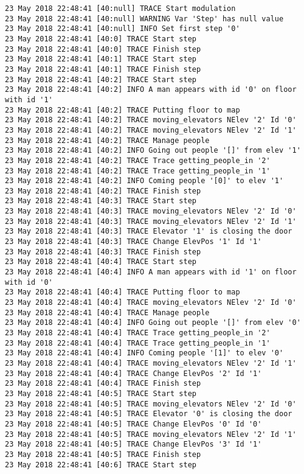 \begin{lstlisting}
23 May 2018 22:48:41 [40:null] TRACE Start modulation
23 May 2018 22:48:41 [40:null] WARNING Var 'Step' has null value
23 May 2018 22:48:41 [40:null] INFO Set first step '0'
23 May 2018 22:48:41 [40:0] TRACE Start step
23 May 2018 22:48:41 [40:0] TRACE Finish step
23 May 2018 22:48:41 [40:1] TRACE Start step
23 May 2018 22:48:41 [40:1] TRACE Finish step
23 May 2018 22:48:41 [40:2] TRACE Start step
23 May 2018 22:48:41 [40:2] INFO A man appears with id '0' on floor with id '1'
23 May 2018 22:48:41 [40:2] TRACE Putting floor to map
23 May 2018 22:48:41 [40:2] TRACE moving_elevators NElev '2' Id '0'
23 May 2018 22:48:41 [40:2] TRACE moving_elevators NElev '2' Id '1'
23 May 2018 22:48:41 [40:2] TRACE Manage people
23 May 2018 22:48:41 [40:2] INFO Going out people '[]' from elev '1'
23 May 2018 22:48:41 [40:2] TRACE Trace getting_people_in '2'
23 May 2018 22:48:41 [40:2] TRACE Trace getting_people_in '1'
23 May 2018 22:48:41 [40:2] INFO Coming people '[0]' to elev '1'
23 May 2018 22:48:41 [40:2] TRACE Finish step
23 May 2018 22:48:41 [40:3] TRACE Start step
23 May 2018 22:48:41 [40:3] TRACE moving_elevators NElev '2' Id '0'
23 May 2018 22:48:41 [40:3] TRACE moving_elevators NElev '2' Id '1'
23 May 2018 22:48:41 [40:3] TRACE Elevator '1' is closing the door
23 May 2018 22:48:41 [40:3] TRACE Change ElevPos '1' Id '1'
23 May 2018 22:48:41 [40:3] TRACE Finish step
23 May 2018 22:48:41 [40:4] TRACE Start step
23 May 2018 22:48:41 [40:4] INFO A man appears with id '1' on floor with id '0'
23 May 2018 22:48:41 [40:4] TRACE Putting floor to map
23 May 2018 22:48:41 [40:4] TRACE moving_elevators NElev '2' Id '0'
23 May 2018 22:48:41 [40:4] TRACE Manage people
23 May 2018 22:48:41 [40:4] INFO Going out people '[]' from elev '0'
23 May 2018 22:48:41 [40:4] TRACE Trace getting_people_in '2'
23 May 2018 22:48:41 [40:4] TRACE Trace getting_people_in '1'
23 May 2018 22:48:41 [40:4] INFO Coming people '[1]' to elev '0'
23 May 2018 22:48:41 [40:4] TRACE moving_elevators NElev '2' Id '1'
23 May 2018 22:48:41 [40:4] TRACE Change ElevPos '2' Id '1'
23 May 2018 22:48:41 [40:4] TRACE Finish step
23 May 2018 22:48:41 [40:5] TRACE Start step
23 May 2018 22:48:41 [40:5] TRACE moving_elevators NElev '2' Id '0'
23 May 2018 22:48:41 [40:5] TRACE Elevator '0' is closing the door
23 May 2018 22:48:41 [40:5] TRACE Change ElevPos '0' Id '0'
23 May 2018 22:48:41 [40:5] TRACE moving_elevators NElev '2' Id '1'
23 May 2018 22:48:41 [40:5] TRACE Change ElevPos '3' Id '1'
23 May 2018 22:48:41 [40:5] TRACE Finish step
23 May 2018 22:48:41 [40:6] TRACE Start step

\end{lstlisting}
